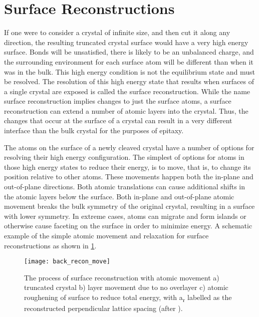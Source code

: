 \section{Surface Reconstructions}\label{sec:reconstruction}
If one were to consider a crystal of infinite size, and then cut it along any direction, the resulting truncated crystal surface would have a very high energy surface.
Bonds will be unsatisfied, there is likely to be an unbalanced charge, and the surrounding environment for each surface atom will be different than when it was in the bulk.
This high energy condition is not the equilibrium state and must be resolved.
The resolution of this high energy state that results when surfaces of a single crystal are exposed is called the surface reconstruction.
While the name surface reconstruction implies changes to just the surface atoms, a surface reconstruction can extend a number of atomic layers into the crystal.
Thus, the changes that occur at the surface of a crystal can result in a very different interface than the bulk crystal for the purposes of epitaxy.

The atoms on the surface of a newly cleaved crystal have a number of options for resolving their high energy configuration.
The simplest of options for atoms in those high energy states to reduce their energy, is to move, that is, to change its position relative to other atoms.
These movements happen both the in-plane and out-of-plane directions.
Both atomic translations can cause additional shifts in the atomic layers below the surface.
Both in-plane and out-of-plane atomic movement breaks the bulk symmetry of the original crystal, resulting in a surface with lower symmetry.
In extreme cases, atoms can migrate and form islands or otherwise cause faceting on the surface in order to minimize energy\cite{Duke1996,oura2010surface}.
A schematic example of the simple atomic movement and relaxation for surface reconstructions as shown in \cref{fig:back_recon_move}.
\begin{figure}
 \centering \texttt{[image: back\_recon\_move]}
 \caption[Simple surface reconstruction]{\label{fig:back_recon_move}The process of surface reconstruction with atomic movement a) truncated crystal b) layer movement due to no overlayer c) atomic roughening of surface to reduce total energy, with a\textsubscript{r} labelled as the reconstructed perpendicular lattice spacing (after \cite{ohring2001materials}).}
\end{figure}

